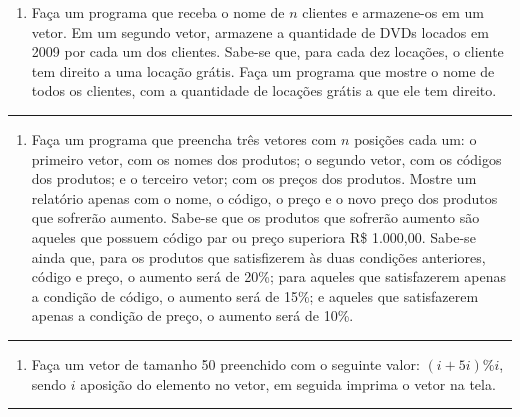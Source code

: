 \documentclass[12pt,a4paper]{article}
\renewcommand{\linethickness}{0.05em}
\providecommand{\tightlist}{%
      \setlength{\itemsep}{0pt}\setlength{\parskip}{0pt}}
\begin{document}
\begin{enumerate}
\def\labelenumi{\arabic{enumi}.}
\setcounter{enumi}{31}
\tightlist
\item
  Faça um programa que receba o nome de \(n\) clientes e armazene-os em
  um vetor. Em um segundo vetor, armazene a quantidade de DVDs locados
  em 2009 por cada um dos clientes. Sabe-se que, para cada dez locações,
  o cliente tem direito a uma locação grátis. Faça um programa que
  mostre o nome de todos os clientes, com a quantidade de locações
  grátis a que ele tem direito.
\end{enumerate}

    \begin{center}\rule{0.5\linewidth}{\linethickness}\end{center}

\begin{enumerate}
\def\labelenumi{\arabic{enumi}.}
\setcounter{enumi}{32}
\tightlist
\item
  Faça um programa que preencha três vetores com \(n\) posições cada um:
  o primeiro vetor, com os nomes dos produtos; o segundo vetor, com os
  códigos dos produtos; e o terceiro vetor; com os preços dos produtos.
  Mostre um relatório apenas com o nome, o código, o preço e o novo
  preço dos produtos que sofrerão aumento. Sabe-se que os produtos que
  sofrerão aumento são aqueles que possuem código par ou preço superiora
  R\$ 1.000,00. Sabe-se ainda que, para os produtos que satisfizerem às
  duas condições anteriores, código e preço, o aumento será de 20\%;
  para aqueles que satisfazerem apenas a condição de código, o aumento
  será de 15\%; e aqueles que satisfazerem apenas a condição de preço, o
  aumento será de 10\%.
\end{enumerate}

    \begin{center}\rule{0.5\linewidth}{\linethickness}\end{center}

\begin{enumerate}
\def\labelenumi{\arabic{enumi}.}
\setcounter{enumi}{33}
\tightlist
\item
  Faça um vetor de tamanho 50 preenchido com o seguinte valor:
  \((i+5i)\%i\), sendo \(i\) aposição do elemento no vetor, em seguida
  imprima o vetor na tela.
\end{enumerate}

    \begin{center}\rule{0.5\linewidth}{\linethickness}\end{center}
\end{document}
